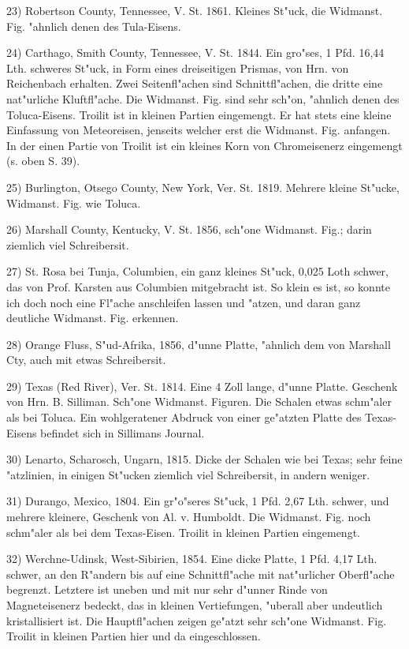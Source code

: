 \documentclass[a4paper, 11pt, oneside, german]{article}
\begin{document}
23) Robertson County, Tennessee, V. St. 1861. Kleines St"uck, die Widmanst. Fig. "ahnlich denen des Tula-Eisens.

24) Carthago, Smith County, Tennessee, V. St. 1844. Ein gro"ses, 1 Pfd. 16,44 Lth. schweres St"uck, in Form eines dreiseitigen Prismas, von Hrn. von Reichenbach erhalten. Zwei Seitenfl"achen sind Schnittfl"achen, die dritte eine nat"urliche Kluftfl"ache. Die Widmanst. Fig. sind sehr sch"on, "ahnlich denen des Toluca-Eisens. Troilit ist in kleinen Partien eingemengt. Er hat stets eine kleine Einfassung von Meteoreisen, jenseits welcher erst die Widmanst. Fig. anfangen. In der einen Partie von Troilit ist ein kleines Korn von Chromeisenerz eingemengt (s. oben S. 39).

25) Burlington, Otsego County, New York, Ver. St. 1819. Mehrere kleine St"ucke, Widmanst. Fig. wie Toluca.

26) Marshall County, Kentucky, V. St. 1856, sch"one Widmanst. Fig.; darin ziemlich viel Schreibersit.

27) St. Rosa bei Tunja, Columbien, ein ganz kleines St"uck, 0,025 Loth schwer, das von Prof. Karsten aus Columbien mitgebracht ist. So klein es ist, so konnte ich doch noch eine Fl"ache anschleifen lassen und "atzen, und daran ganz deutliche Widmanst. Fig. erkennen.

28) Orange Fluss, S"ud-Afrika, 1856, d"unne Platte, "ahnlich dem von Marshall Cty, auch mit etwas Schreibersit.

29) Texas (Red River), Ver. St. 1814. Eine 4 Zoll lange, d"unne Platte. Geschenk von Hrn. B. Silliman. Sch"one Widmanst. Figuren. Die Schalen etwas schm"aler als bei Toluca. Ein wohlgeratener Abdruck von einer ge"atzten Platte des Texas-Eisens befindet sich in Sillimans Journal.

30) Lenarto, Scharosch, Ungarn, 1815. Dicke der Schalen wie bei Texas; sehr feine "atzlinien, in einigen St"ucken ziemlich viel Schreibersit, in andern weniger.

31) Durango, Mexico, 1804. Ein gr"o"seres St"uck, 1 Pfd. 2,67 Lth. schwer, und mehrere kleinere, Geschenk von Al. v. Humboldt. Die Widmanst. Fig. noch schm"aler als bei dem Texas-Eisen. Troilit in kleinen Partien eingemengt.

32) Werchne-Udinsk, West-Sibirien, 1854. Eine dicke Platte, 1 Pfd. 4,17 Lth. schwer, an den R"andern bis auf eine Schnittfl"ache mit nat"urlicher Oberfl"ache begrenzt. Letztere ist uneben und mit nur sehr d"unner Rinde von Magneteisenerz bedeckt, das in kleinen Vertiefungen, "uberall aber undeutlich kristallisiert ist. Die Hauptfl"achen zeigen ge"atzt sehr sch"one Widmanst. Fig. Troilit in kleinen Partien hier und da eingeschlossen.
\end{document}

